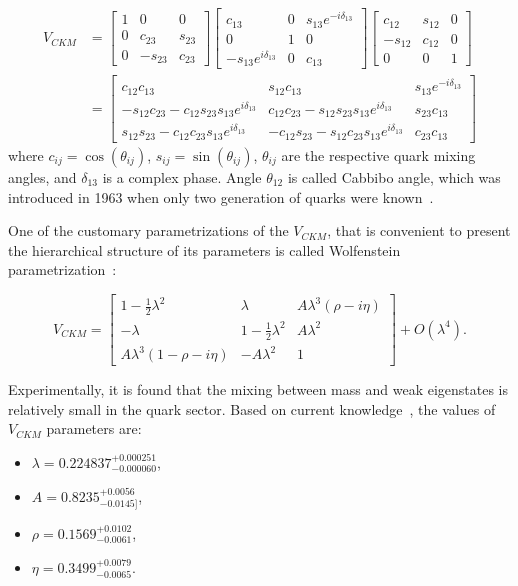 \begin{align} V_{CKM}  &= \begin{bmatrix} 1 & 0 & 0 \\ 0 & c_{23} & s_{23} \\ 0 & -s_{23} & c_{23} \end{bmatrix}
 \begin{bmatrix} c_{13} & 0 & s_{13}e^{-i\delta_{13}} \\ 0 & 1 & 0 \\ -s_{13}e^{i\delta_{13}} & 0 & c_{13} \end{bmatrix}
 \begin{bmatrix} c_{12} & s_{12} & 0 \\ -s_{12} & c_{12} & 0 \\ 0 & 0 & 1 \end{bmatrix} \nonumber \\ 
 & = \begin{bmatrix} c_{12}c_{13} & s_{12} c_{13} & s_{13}e^{-i\delta_{13}} \\
 -s_{12}c_{23} - c_{12}s_{23}s_{13}e^{i\delta_{13}} & c_{12}c_{23} - s_{12}s_{23}s_{13}e^{i\delta_{13}} & s_{23}c_{13}\\
 s_{12}s_{23} - c_{12}c_{23}s_{13}e^{i\delta_{13}} & -c_{12}s_{23} - s_{12}c_{23}s_{13}e^{i\delta_{13}} & c_{23}c_{13} \end{bmatrix}
\end{align}
where $c_{ij} =\cos(\theta_{ij})$, $s_{ij} =\sin(\theta_{ij})$,  $\theta_{ij}$ are the respective quark mixing angles, and $\delta_{13}$ is a complex phase. Angle $\theta_{12}$ is called Cabbibo angle, which was introduced in 1963 when only two generation of quarks were known~\cite{cabibbo}. 


One of the customary parametrizations of the $V_{CKM}$, that is convenient to present the hierarchical structure of its parameters is called Wolfenstein parametrization~\cite{wolfenstein}:

\begin{equation}
\label{eq:wolfenstein}
   V_{CKM} =  \begin{bmatrix} 1-\tfrac{1}{2}\lambda^2 & \lambda & A\lambda^3(\rho-i\eta) \\
 -\lambda & 1-\tfrac{1}{2}\lambda^2 & A\lambda^2 \\
 A\lambda^3(1-\rho-i\eta) & -A\lambda^2 & 1  \end{bmatrix} + O(\lambda^4).
\end{equation}

Experimentally, it is found that the mixing between mass and weak eigenstates is relatively small in the quark sector. Based on current knowledge~\cite{CKMFitter}, the values of $V_{CKM}$ parameters are:
\begin{itemize}
\item $\lambda=0.224837^{+0.000251}_{-0.000060}$,
 \item  $A= 0.8235^{+0.0056}_{-0.0145]}$, 
 \item  $\rho=0.1569^{+0.0102}_{-0.0061}$,
 \item  $\eta=0.3499^{+0.0079}_{-0.0065}$.
\end{itemize}

